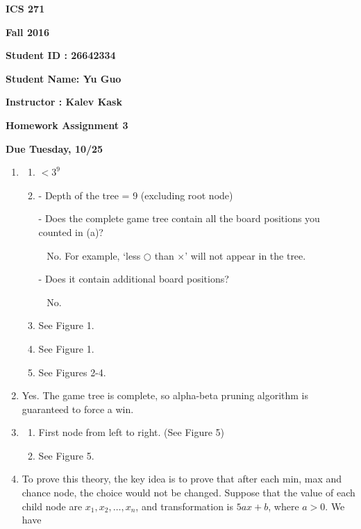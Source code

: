 \documentclass{article}
\begin{document}
{\bf ICS 271}

{\bf Fall 2016}

{\bf Student ID : 26642334}

{\bf Student Name: Yu Guo}

{\bf Instructor : Kalev Kask}

{\bf Homework Assignment 3}

{\bf Due Tuesday, 10/25}




\begin{enumerate}

\item

  \begin{enumerate}
    \item $<3^9$

    \item - Depth of the tree = 9 (excluding root node)

    - Does the complete game tree contain all the board positions you counted in (a)? 

    ~ No. For example, `less $\bigcirc$ than $\times$' will not appear in the tree. 

    - Does it contain additional board positions? 

    ~ No.

    \item See Figure 1. 

    \item See Figure 1.

    \item See Figures 2-4.


  \end{enumerate}


\item

Yes. The game tree is complete, so alpha-beta pruning algorithm is guaranteed to force a win.

\item
  
  \begin{enumerate}
    \item First node from left to right. (See Figure 5)

    \item See Figure 5.
  \end{enumerate}


\item

To prove this theory, the key idea is to prove that after each min, max and chance node, the choice would not be changed. 
Suppose that the value of each child node are $x_1,x_2,\dots,x_n$, and transformation is $5ax+b$, where $a>0$. We have


\end{enumerate}
\end{document}
